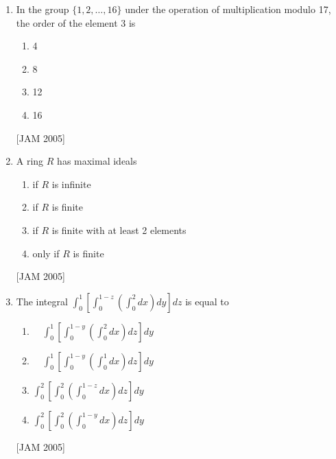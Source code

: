 \begin{enumerate}
 
\item  In the group $\{1,2, \ldots, 16\}$ under the operation of multiplication modulo 17, the order of the element 3 is
\begin{enumerate} 
    \item 4
    \item 8
    \item 12
    \item 16
 \end{enumerate}
 \hfill [JAM 2005]


 
\item A ring $R$ has maximal ideals
\begin{enumerate} 
    \item if $R$ is infinite
    \item if $R$ is finite
    \item if $R$ is finite with at least 2 elements
    \item only if $R$ is finite 
\end{enumerate}
 \hfill [JAM 2005]



\item  The integral 
$\int_{0}^{1}\left[\int_{0}^{1-z}\left(\int_{0}^{2} d x\right) d y\right] d z$ is equal to
\begin{enumerate}
    \item $\quad \int_{0}^{1}\left[\int_{0}^{1-y}\left(\int_{0}^{2} d x\right) d z\right] d y$
    \item $\quad \int_{0}^{1}\left[\int_{0}^{1-y}\left(\int_{0}^{1} d x\right) d z\right] d y$
    \item $\int_{0}^{2}\left[\int_{0}^{2}\left(\int_{0}^{1-z} d x\right) d z\right] d y$
    \item $\int_{0}^{2}\left[\int_{0}^{2}\left(\int_{0}^{1-y} d x\right) d z\right] d y$
 \end{enumerate}
 \hfill [JAM 2005]



\end{enumerate}
